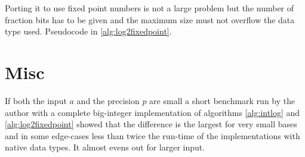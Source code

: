 \begin{center}
  \begin{algorithmic}[1]
    \Repeat 
       \EndWhile
       \EndWhile
    \Repeat
       \EndIf
    \EndFunction
  \end{algorithmic}
\end{center}

Porting it to use fixed point numbers is not a large problem but the number
of fraction bits has to be given and the maximum size must not overflow
the data type used. Pseudocode in \ref{alg:log2fixedpoint}.

\begin{center}
  \begin{algorithmic}[1]
        \EndIf
    \EndFor
    \EndFunction
  \end{algorithmic}
\end{center}

\section{Misc}

If both the input $a$ and the precision $p$ are small a short benchmark run
by the author with a complete big-integer implementation of algorithms \ref{alg:intlog}
and \ref{alg:log2fixedpoint} showed that the difference is the largest for very small
bases and in some edge-cases less than twice the run-time of the implementations
with native data types. It almost evens out for larger input.

